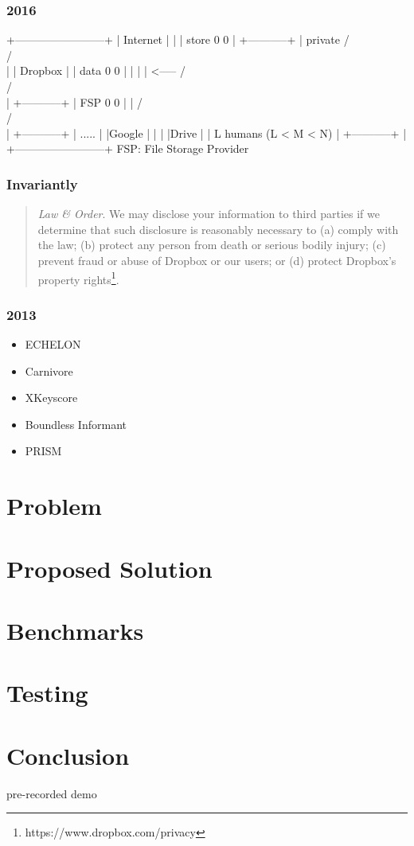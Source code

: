 \documentclass[17pt]{beamer}
\begin{document}
\begin{frame}[fragile]
  \frametitle{2016}
  {\scriptsize
  \begin{semiverbatim}
   +------------------------+
   | Internet               |
   |                        | store    0   0
   |  +-----------+         | private / \\ / \\
   |  | Dropbox   |         |  data    0   0
   |  |           |         | <-----  / \\ / \\
   |  +-----------+         |   FSP    0   0
   |                        |         / \\ / \\
   |          +-----------+ |          .....
   |          |Google     | |
   |          |Drive      | |             L humans (L < M < N)
   |          +-----------+ |
   +------------------------+      FSP: File Storage Provider
  \end{semiverbatim}
  }
\end{frame}

\begin{frame}
  \frametitle{Invariantly}
  {\small
  \begin{quote}
    \emph{Law \& Order}. We may disclose your information to third
    parties if we determine that such disclosure is reasonably
    necessary to (a) comply with the law; (b) protect any person from
    death or serious bodily injury; (c) prevent fraud or abuse of
    Dropbox or our users; or (d) protect Dropbox's property
    rights\footnote{https://www.dropbox.com/privacy}.
  \end{quote}
  }
\end{frame}

\begin{frame}
  \frametitle{2013}

  \begin{itemize}
  \item ECHELON
  \item Carnivore
  \item XKeyscore
  \item Boundless Informant
  \item PRISM
  \end{itemize}
\end{frame}

\section{Problem}
\section{Proposed Solution}
\section{Benchmarks}
\section{Testing}
\section{Conclusion}

\begin{frame}
  \centering pre-recorded demo
\end{frame}
\end{document}
